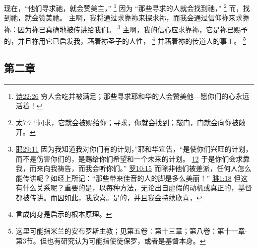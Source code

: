 \documentclass[12pt, a4paper, oneside]{ctexart}
\begin{document}
	现在，“他们寻求祂，就会赞美主，”
	\footnote {
		\href{https://biblehub.com/psalms/22-26.htm}{诗22:26} 穷人会吃并被满足；那些寻求耶和华的人会赞美他---愿你们的心永远活着！
	}
	因为 “那些寻求的人就会找到祂，”
	\footnote {
		\href{https://biblehub.com/matthew/7-7.htm}{太7:7} “问求，它就会被赐给你；寻求，你就会找到；敲门，门就会向你被敞开。
	}
	而，找到祂，就会赞美祂。
    主啊，我将通过求靠祢来探求祢，而我会通过信仰祢来求靠祢：因为祢已真确地被传讲给我们。
    \footnote {
		\href{https://biblehub.com/jeremiah/29-11.htm}{耶29:11} 因为我知道我对你们有的计划，”耶和华宣告，“是使你们兴旺的计划，而不是伤害你们的，是赐给你们希望和一个未来的计划。
        \href{https://biblehub.com/jeremiah/29-12.htm}{12} 于是你们会求靠我，而来向我祷告，而我会听你们。”
        \href{https://biblehub.com/romans/10-15.htm}{罗10:15} 而除非他们被差派，任何人怎么能传讲呢？如经上所记：“那些带来佳音的人的脚是多么美丽！”
        \href{https://biblehub.com/philippians/1-18.htm}{腓1:18} 但这有什么关系呢？重要的是，以每种方法，无论出自虚假的动机或真正的，基督都被传讲。而因如此，我欣喜。是的，并且我会持续欣喜，
	}
	主啊，我的信心应求靠祢，它是祢已赐予的，并且祢用它已启发我，藉着祢圣子的人性，
    \footnote {
		言成肉身是启示的根本原理。
	}
    并藉着祢的传道人的事工。
	\footnote {
		这里可能指米兰的安布罗斯主教；见第五卷：第十三章；第八卷：第十一章-第3节。但也有研究认为可能指使徒保罗，或者是基督本身。
	}

\subsection{第二章}
\end{document}
